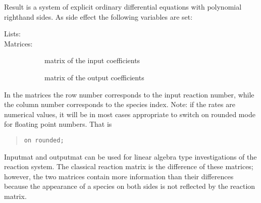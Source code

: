 Result is a system of explicit ordinary differential
 equations with polynomial righthand sides. As side
 effect the following variables are set:
 \begin{description}
 \item [Lists:]
\item[Matrices: ]
  \begin{description}
  \item[]
    \hypertarget{variable:INPUTMAT}{}
    matrix of the input coefficients
 \item[]
    \hypertarget{variable:OUTPUTMAT}{}
    matrix of the output coefficients
  \end{description}
 \end{description}
In the matrices the row number corresponds to the input reaction 
number, while the column number corresponds to the species index.
Note: if the rates are numerical values, it will be in most cases
appropriate to switch on \REDUCE{} rounded mode for floating
point numbers. That is
\begin{quote}
  \texttt{on rounded;}
\end{quote}
Inputmat and outputmat can be used for linear algebra type 
investigations of the reaction system. The classical reaction 
matrix is the difference of these matrices; however, the two 
matrices contain more information than their differences because 
the appearance of a species on both sides is not reflected by 
the reaction matrix.

